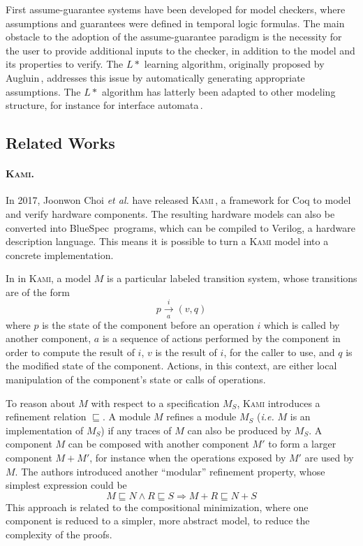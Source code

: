 First assume-guarantee systems have been developed for model checkers, where
assumptions and guarantees were defined in temporal logic formulas.
%
The main obstacle to the adoption of the assume-guarantee paradigm is the
necessity for the user to provide additional inputs to the checker, in addition
to the model and its properties to verify.
%
The \( L* \) learning algorithm, originally proposed by
Augluin\,\cite{angluin1987lstart}, addresses this issue by automatically
generating appropriate assumptions.
%
The \( L* \) algorithm has latterly been adapted to other modeling structure,
for instance for interface automata\,\cite{emmi2008assume}.

\subsection{Related Works}

\paragraph{{\scshape Kami}.}
%
In 2017, Joonwon Choi \emph{et al.} have released {\scshape
  Kami}\,\cite{choi2017kami}, a framework for Coq to model and verify hardware
components.
%
The resulting hardware models can also be converted into
BlueSpec\,\cite{nikhil2004bluespec} programs, which can be compiled to Verilog,
a hardware description language.
%
This means it is possible to turn a {\scshape Kami} model into a concrete
implementation.

In in {\scshape Kami}, a model \( M \) is a particular labeled transition
system, whose transitions are of the form
%
\[
  p \xrightarrow[a]{i} (v, q)
\]
%
where \( p \) is the state of the component before an operation \( i \) which is
called by another component, \( a \) is a sequence of actions performed by the
component in order to compute the result of \( i \), \( v \) is the result of
\( i \), for the caller to use, and \( q \) is the modified state of the
component.
%
Actions, in this context, are either local manipulation of the component's state
or calls of operations.

To reason about \( M \) with respect to a specification \( M_S \), {\scshape
  Kami} introduces a refinement relation \( \sqsubseteq \).
%
A module \( M \) refines a module \( M_S \) (\emph{i.e.} \( M \) is an
implementation of \( M_S \)) if any traces of \( M \) can also be produced by
\( M_S \).
%
A component \( M \) can be composed with another component \( M' \) to form a
larger component \( M + M' \), for instance when the operations exposed by
\( M' \) are used by \( M \).
%
The authors introduced another ``modular'' refinement property, whose simplest
expression could be
%
\[
  M \sqsubseteq N \wedge R \sqsubseteq S \Rightarrow M + R \sqsubseteq N + S
\]
%
This approach is related to the compositional minimization, where one component
is reduced to a simpler, more abstract model, to reduce the complexity of the
proofs.

